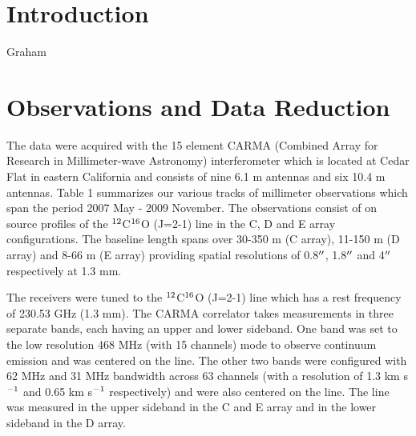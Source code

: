 \documentclass[manuscript]{aastex}
\begin{document}

\section{Introduction}

Graham

\section{Observations and Data Reduction}

The data were acquired with the 15 element CARMA (Combined Array for Research in Millimeter-wave Astronomy) interferometer which is located at Cedar Flat in eastern California and consists of nine 6.1 m antennas and six 10.4 m antennas. Table 1 summarizes our various tracks of millimeter observations which span the period 2007 May - 2009 November. The observations consist of on source profiles of the $\rm{{}^{12}}$C$\rm{{}^{16}}$O (J=2-1) line in the C, D and E array configurations. The baseline length spans over 30-350 m (C array), 11-150 m (D array) and 8-66 m (E array) providing spatial resolutions of 0.8$\mbox{$^{\prime\prime}$}$, 1.8$\mbox{$^{\prime\prime}$}$ and 4$\mbox{$^{\prime\prime}$}$ respectively at 1.3 mm. 

The receivers were tuned to the $\rm{{}^{12}}$C$\rm{{}^{16}}$O (J=2-1) line which has a rest frequency of 230.53 GHz (1.3 mm). The CARMA correlator takes measurements in three separate bands, each having an upper and lower sideband. One band was set to the low resolution 468 MHz   (with 15 channels) mode to observe continuum emission and was centered on the line. The other two bands were configured with 62 MHz and 31 MHz bandwidth across 63 channels (with a resolution of 1.3 km s$\rm{{}^{-1}}$ and 0.65 km s$\rm{{}^{-1}}$ respectively) and were also centered on the line. The line was measured in the upper sideband in the C and E array and in the lower sideband in the D array.
\end{document}
